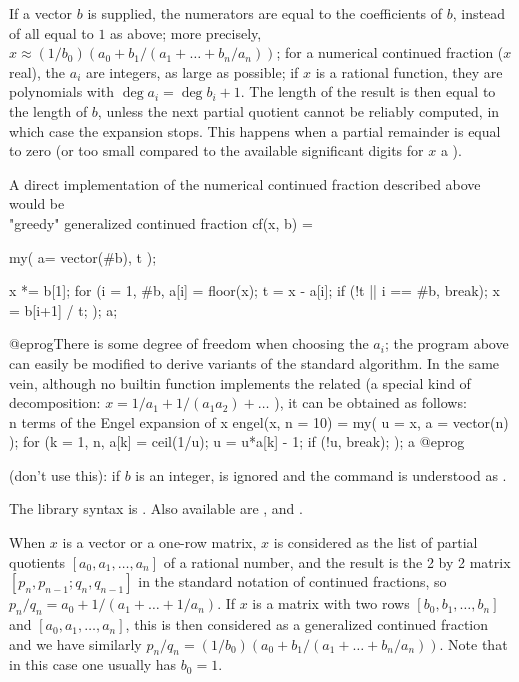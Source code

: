 If a vector $b$ is supplied, the numerators are equal to the coefficients
of $b$, instead of all equal to $1$ as above; more precisely, $x \approx
(1/b_0)(a_0+b_1/(a_1+\dots+b_n/a_n))$; for a numerical continued fraction
($x$ real), the $a_i$ are integers, as large as possible; if $x$ is a
rational function, they are polynomials with $\deg a_i = \deg b_i + 1$.
The length of the result is then equal to the length of $b$, unless the next
partial quotient cannot be reliably computed, in which case the expansion
stops. This happens when a partial remainder is equal to zero (or too small
compared to the available significant digits for $x$ a ).

A direct implementation of the numerical continued fraction
 described above would be
\bprog
\\ "greedy" generalized continued fraction
cf(x, b) =
{ my( a= vector(#b), t );

  x *= b[1];
  for (i = 1, #b,
    a[i] = floor(x);
    t = x - a[i]; if (!t || i == #b, break);
    x = b[i+1] / t;
  ); a;
}
@eprog\noindent There is some degree of freedom when choosing the $a_i$; the
program above can easily be modified to derive variants of the standard
algorithm. In the same vein, although no builtin
function implements the related  (a special kind of
 decomposition: $x = 1/a_1 + 1/(a_1a_2) + \dots$ ),
it can be obtained as follows:
\bprog
\\ n terms of the Engel expansion of x
engel(x, n = 10) =
{ my( u = x, a = vector(n) );
  for (k = 1, n,
    a[k] = ceil(1/u);
    u = u*a[k] - 1;
    if (!u, break);
  ); a
}
@eprog

 (don't use this): if $b$ is an integer, 
is ignored and the command is understood as .

The library syntax is .
Also available are ,
 and .

\label{se:contfracpnqn}
When $x$ is a vector or a one-row matrix, $x$
is considered as the list of partial quotients $[a_0,a_1,\dots,a_n]$ of a
rational number, and the result is the 2 by 2 matrix
$[p_n,p_{n-1};q_n,q_{n-1}]$ in the standard notation of continued fractions,
so $p_n/q_n=a_0+1/(a_1+\dots+1/a_n)$. If $x$ is a matrix with two rows
$[b_0,b_1,\dots,b_n]$ and $[a_0,a_1,\dots,a_n]$, this is then considered as a
generalized continued fraction and we have similarly
$p_n/q_n=(1/b_0)(a_0+b_1/(a_1+\dots+b_n/a_n))$. Note that in this case one
usually has $b_0=1$.

